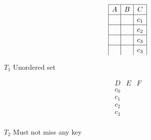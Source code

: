 \vspace{2em}
\begin{table}[ht!]
    \parbox{.45\linewidth}{
        \centering
        \[
        \renewcommand\arraystretch{1.2}
        \begin{array}{|c|c|c|}
            \hline
                A & B & C\\
            \hline
                & & c_1 \\ 
            \hline
                & & c_2 \\ 
            \hline
                & & c_3 \\ 
            \hline
                & & c_3 \\ 
        \end{array}
        \]

        \captionsetup{labelformat=empty}
        \caption*{$T_1$ {\color{red} Unordered set}}
    }
    \parbox{.45\linewidth}{
        \centering
        \[
        \renewcommand\arraystretch{1.2}
        \begin{array}{|c|c|c|}
            \hline
                D & E & F\\
            \hline
                c_0 & & \\ 
            \hline
                c_1 & & \\ 
            \hline
                c_2 & & \\ 
            \hline
                c_3 & & \\ 
        \end{array}
        \]

        \captionsetup{labelformat=empty}
        \caption*{$T_2$ {\color{red} Must not miss any key}}
    }
\end{table}

\vspace{2em}

